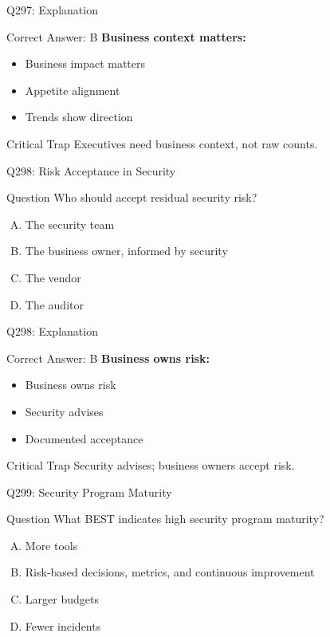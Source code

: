 \documentclass{beamer}
\begin{document}
	\begin{frame}{Q297: Explanation}
		\begin{block}{Correct Answer: B}
			\textbf{Business context matters:}
			\begin{itemize}
				\item Business impact matters
				\item Appetite alignment
				\item Trends show direction
			\end{itemize}
		\end{block}
		\begin{alertblock}{Critical Trap}
			Executives need business context, not raw counts.
		\end{alertblock}
	\end{frame}
	
	\begin{frame}{Q298: Risk Acceptance in Security}
		\begin{block}{Question}
			Who should accept residual security risk?
		\end{block}
		\begin{enumerate}[(A)]
			\item The security team
			\item The business owner, informed by security
			\item The vendor
			\item The auditor
		\end{enumerate}
	\end{frame}
	
	\begin{frame}{Q298: Explanation}
		\begin{block}{Correct Answer: B}
			\textbf{Business owns risk:}
			\begin{itemize}
				\item Business owns risk
				\item Security advises
				\item Documented acceptance
			\end{itemize}
		\end{block}
		\begin{alertblock}{Critical Trap}
			Security advises; business owners accept risk.
		\end{alertblock}
	\end{frame}
	
	\begin{frame}{Q299: Security Program Maturity}
		\begin{block}{Question}
			What BEST indicates high security program maturity?
		\end{block}
		\begin{enumerate}[(A)]
			\item More tools
			\item Risk-based decisions, metrics, and continuous improvement
			\item Larger budgets
			\item Fewer incidents
		\end{enumerate}
	\end{frame}
	
\end{document}
